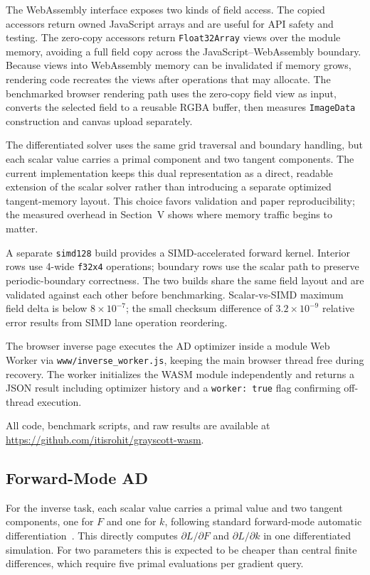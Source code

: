 \documentclass[journal]{IEEEtran}
\begin{document}
The WebAssembly interface exposes two kinds of field access. The copied accessors
return owned JavaScript arrays and are useful for API safety and testing. The
zero-copy accessors return \texttt{Float32Array} views over the module memory,
avoiding a full field copy across the JavaScript--WebAssembly boundary. Because
views into WebAssembly memory can be invalidated if memory grows, rendering code
recreates the views after operations that may allocate. The benchmarked browser
rendering path uses the zero-copy field view as input, converts the selected
field to a reusable RGBA buffer, then measures \texttt{ImageData} construction
and canvas upload separately.

The differentiated solver uses the same grid traversal and boundary handling,
but each scalar value carries a primal component and two tangent components. The
current implementation keeps this dual representation as a direct, readable
extension of the scalar solver rather than introducing a separate optimized
tangent-memory layout. This choice favors validation and paper reproducibility;
the measured overhead in Section~V shows where memory traffic begins to matter.

A separate \texttt{simd128} build provides a SIMD-accelerated forward kernel.
Interior rows use 4-wide \texttt{f32x4} operations; boundary rows use the scalar
path to preserve periodic-boundary correctness. The two builds share the same
field layout and are validated against each other before benchmarking.
Scalar-vs-SIMD maximum field delta is below \(8\times10^{-7}\); the small
checksum difference of \(3.2\times10^{-9}\) relative error results from SIMD
lane operation reordering.

The browser inverse page executes the AD optimizer inside a module Web Worker
via \texttt{www/inverse\_worker.js}, keeping the main browser thread free during
recovery. The worker initializes the WASM module independently and returns a
JSON result including optimizer history and a \texttt{worker: true} flag
confirming off-thread execution.

All code, benchmark scripts, and raw results are available at
\url{https://github.com/itisrohit/grayscott-wasm}.

\subsection{Forward-Mode AD}
For the inverse task, each scalar value carries a primal value and two tangent
components, one for \(F\) and one for \(k\), following standard forward-mode
automatic differentiation~\cite{rall1981automatic,griewank2008evaluating,
bartholomew2000automatic,pearlmutter1994fast,baydin2018automatic}. This directly
computes \(\partial L/\partial F\) and \(\partial L/\partial k\) in one
differentiated simulation. For two parameters this is expected to be cheaper than
central finite differences, which require five primal evaluations per gradient
query.
\end{document}
